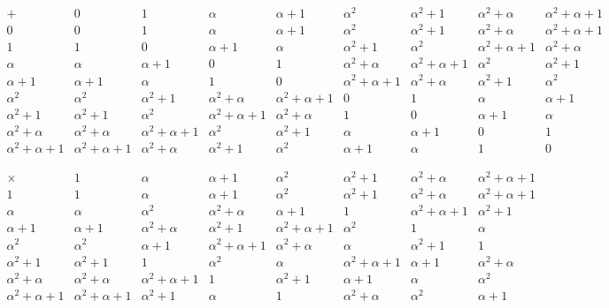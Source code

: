 \[
\begin{array}{c|cccccccc}
+ & 0 & 1 & \alpha & \alpha+1 & \alpha^2 & \alpha^2 + 1 & \alpha^2 + \alpha & \alpha^2 + \alpha + 1\\
\hline
0                     &       0        & 1          & \alpha     & \alpha + 1 & \alpha^2 & \alpha^2 + 1 & \alpha^2 + \alpha & \alpha^2 + \alpha + 1 \\
1                     &        1        & 0          & \alpha + 1 & \alpha   & \alpha^2 + 1 & \alpha^2 & \alpha^2 + \alpha + 1 & \alpha^2 + \alpha \\
\alpha                &   \alpha   & \alpha + 1 & 0          & 1  & \alpha^2 + \alpha & \alpha^2 + \alpha + 1 & \alpha^2 & \alpha^2 + 1 \\
\alpha+1              & \alpha + 1     & \alpha     & 1         &   0       & \alpha^2 + \alpha + 1 & \alpha^2 + \alpha &  \alpha^2 + 1 & \alpha^2 \\
\alpha^2              & \alpha^2 & \alpha^2 + 1 & \alpha^2 + \alpha & \alpha^2 + \alpha + 1 & 0 & 1 &  \alpha & \alpha + 1 \\
\alpha^2 + 1          & \alpha^2 + 1 & \alpha^2 & \alpha^2 + \alpha + 1 & \alpha^2 + \alpha & 1 & 0 & \alpha + 1 & \alpha \\
\alpha^2 + \alpha     & \alpha^2 + \alpha & \alpha^2 + \alpha + 1 & \alpha^2 & \alpha^2 + 1 & \alpha & \alpha + 1 & 0 & 1 \\
\alpha^2 + \alpha + 1 &  \alpha^2 + \alpha + 1 & \alpha^2 + \alpha & \alpha^2 + 1 & \alpha^2 & \alpha + 1 & \alpha & 1 & 0
\end{array}
\]

\[
\begin{array}{c|ccccccc}
\times                     &       1          & \alpha     & \alpha+1 & \alpha^2 & \alpha^2 + 1 & \alpha^2 + \alpha & \alpha^2 + \alpha + 1\\
\hline
1                     & 1          & \alpha     & \alpha+1 & \alpha^2 & \alpha^2 + 1 & \alpha^2 + \alpha & \alpha^2 + \alpha + 1\\
\alpha      & \alpha & \alpha^2 & \alpha^2 + \alpha & \alpha + 1 & 1 & \alpha^2 + \alpha + 1 & \alpha^2 + 1 \\
\alpha+1              & \alpha + 1 & \alpha^2 + \alpha & \alpha^2 + 1 & \alpha^2 + \alpha + 1 & \alpha^2 & 1 & \alpha \\
\alpha^2 & \alpha^2 & \alpha +1 & \alpha^2 + \alpha + 1 & \alpha^2 + \alpha & \alpha & \alpha^2+1 & 1 \\ 
\alpha^2 + 1          & \alpha^2 + 1 & 1 & \alpha^2 & \alpha & \alpha^2+\alpha +1 & \alpha + 1& \alpha^2 + \alpha \\
\alpha^2 + \alpha  & \alpha^2 + \alpha & \alpha^2 + \alpha +1 & 1 & \alpha^2+1 & \alpha + 1 & \alpha & \alpha^2 \\
\alpha^2 + \alpha + 1 & \alpha^2 + \alpha + 1 & \alpha^2 + 1 & \alpha & 1 & \alpha^2+\alpha & \alpha^2 & \alpha +1 
\end{array}
\]
